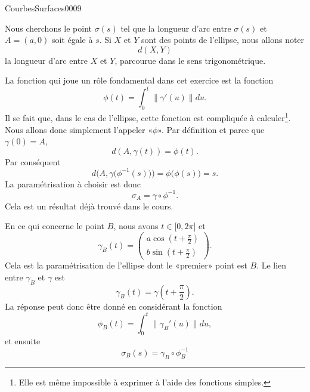 \begin{corrige}{CourbesSurfaces0009}

Nous cherchons le point \(\sigma(s)\) tel que la longueur d'arc entre \(\sigma(s)\) et \(A=(a,0)\) soit égale à \(s\). Si \(X\) et \(Y\) sont des points de l'ellipse, nous allons noter
\begin{equation}
    d(X,Y) 
\end{equation}
la longueur d'arc entre \(X\) et \(Y\), parcourue dans le sens trigonométrique.

La fonction qui joue un rôle fondamental dans cet exercice est la fonction
\begin{equation}
    \phi(t)=\int_0^t\| \gamma'(u) \|du.
\end{equation}
Il se fait que, dans le cas de l'ellipse, cette fonction est compliquée à calculer\footnote{Elle est même impossible à exprimer à l'aide des fonctions simples.}. Nous allons donc simplement l'appeler «\(\phi\)». Par définition et parce que \(\gamma(0)=A\),
\begin{equation}
    d(A,\gamma(t))=\phi(t).
\end{equation}
Par conséquent
\begin{equation}
    d\Big( A,\gamma\big( \phi^{-1}(s) \big) \Big)=\phi\big( \phi(s) \big)=s.
\end{equation}
La paramétrisation à choisir est donc
\begin{equation}
    \sigma_A=\gamma\circ\phi^{-1}.
\end{equation}
Cela est un résultat déjà trouvé dans le cours.

En ce qui concerne le point \(B\), nous avons \(t\in\mathopen[ 0 , 2\pi \mathclose]\) et
\begin{equation}
    \gamma_B(t)=\begin{pmatrix}
        a\cos(t+\frac{ \pi }{2})    \\ 
        b\sin(t+\frac{ \pi }{2})    
    \end{pmatrix}.
\end{equation}
Cela est la paramétrisation de l'ellipse dont le «premier» point est \(B\). Le lien entre \(\gamma_B\) et \(\gamma\) est
\begin{equation}
    \gamma_B(t)=\gamma(t+\frac{ \pi }{2}).
\end{equation}
La réponse peut donc être donné en considérant la fonction
\begin{equation}
    \phi_B(t)=\int_0^t\| \gamma_B'(u) \|du,
\end{equation}
et ensuite
\begin{equation}        \label{EqReponseSigmaB}
    \sigma_B(s)=\gamma_B\circ\phi_B^{-1}
\end{equation}


\end{corrige}
